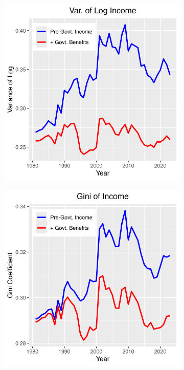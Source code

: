 \documentclass{article}
\begin{document}
\begin{figure}
    \centering
    \begin{subfigure}[t]{0.475\textwidth}
        \centering
        \includegraphics[width=\textwidth]{Fig_5/Fig_5a_Var_inc.png}
        \label{fig:Gov_Var1}
    \end{subfigure}
    \begin{subfigure}[t]{0.475\textwidth}
        \centering
        \includegraphics[width=\textwidth]{Fig_5/Fig_5b_Gini_inc.png}

\end{subfigure}
\end{figure}
\end{document}

